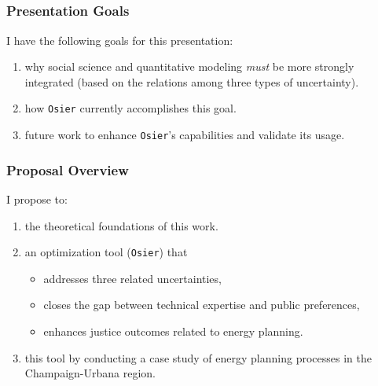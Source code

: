 \subsection{}
\begin{frame}
    \frametitle{Presentation Goals}
    I have the following goals for this presentation:

    \begin{enumerate}
        \item {} why social science and quantitative modeling \textit{must} be more strongly integrated 
        (based on the relations among three types of uncertainty).
        \item {} how \texttt{Osier} currently accomplishes this goal.
        \item {} future work to enhance \texttt{Osier}'s capabilities and validate its usage.
    \end{enumerate}

\end{frame}

\begin{frame}
    \frametitle{Proposal Overview}

    I propose to:

    \begin{enumerate}
        \item {} the theoretical foundations of this work.
        \item {} an optimization tool (\texttt{Osier}) that
        \begin{itemize}
            \item addresses three related uncertainties,
            \item closes the gap between technical expertise and public preferences,
            \item enhances justice outcomes related to energy planning.
        \end{itemize}
        \item {} this tool by conducting a case study of energy planning processes
        in the Champaign-Urbana region.
    \end{enumerate}

\end{frame}
